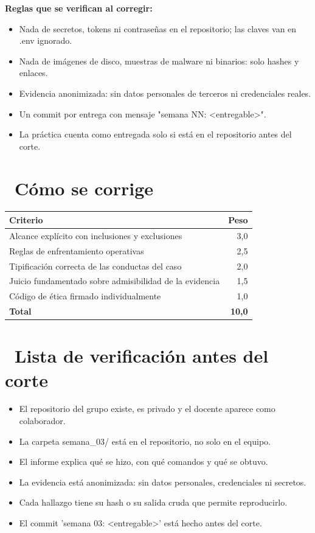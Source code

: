 \documentclass[11pt,a4paper]{article}
\newcommand{\iconotexto}[2]{\textcolor{cyanNeon}{\faIcon{#1}}~#2}
\begin{document}
\textbf{Reglas que se verifican al corregir:}

\begin{itemize}[leftmargin=1.4em,itemsep=2pt,topsep=3pt]
  \item Nada de secretos, tokens ni contraseñas en el repositorio; las claves van en .env ignorado.
  \item Nada de imágenes de disco, muestras de malware ni binarios: solo hashes y enlaces.
  \item Evidencia anonimizada: sin datos personales de terceros ni credenciales reales.
  \item Un commit por entrega con mensaje "semana NN: \textless{}entregable\textgreater{}".
  \item La práctica cuenta como entregada solo si está en el repositorio antes del corte.
\end{itemize}

\section{\iconotexto{ruler-combined}{Cómo se corrige}}

\begin{tabularx}{\linewidth}{@{}X r@{}}
\toprule
Criterio & Peso\\
\midrule
Alcance explícito con inclusiones y exclusiones & 3,0 \\
Reglas de enfrentamiento operativas & 2,5 \\
Tipificación correcta de las conductas del caso & 2,0 \\
Juicio fundamentado sobre admisibilidad de la evidencia & 1,5 \\
Código de ética firmado individualmente & 1,0 \\
\midrule
\textbf{Total} & \textbf{10,0}\\
\bottomrule
\end{tabularx}

\section{\iconotexto{clipboard-check}{Lista de verificación antes del corte}}

\begin{itemize}[leftmargin=1.4em,itemsep=2pt,topsep=3pt]
  \item El repositorio del grupo existe, es privado y el docente aparece como colaborador.
  \item La carpeta semana\_03/ está en el repositorio, no solo en el equipo.
  \item El informe explica qué se hizo, con qué comandos y qué se obtuvo.
  \item La evidencia está anonimizada: sin datos personales, credenciales ni secretos.
  \item Cada hallazgo tiene su hash o su salida cruda que permite reproducirlo.
  \item El commit 'semana 03: \textless{}entregable\textgreater{}' está hecho antes del corte.
\end{itemize}
\end{document}
